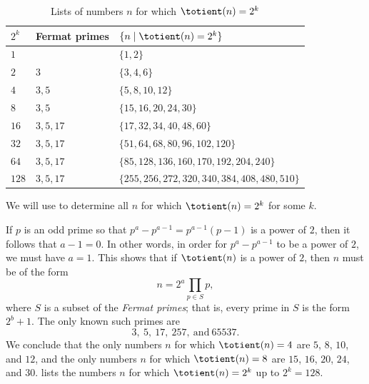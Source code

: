 \begin{example}
  \begin{table}[t]
    \centering
    \begin{tabular}{lll}
      $2^k$ & Fermat primes & $\{n\mid \totient(n)=2^k\}$ \\
      \midrule
      $1$   &             & $\{1,2\}$ \\
      $2$   & $3$         & $\{3,4,6\}$ \\
      $4$   & $3,5$       & $\{5,8,10,12\}$ \\
      $8$   & $3,5$       & $\{15,16,20,24,30\}$ \\
      $16$  & $3,5,17$    & $\{17,32,34,40,48,60\}$ \\
      $32$  & $3,5,17$    & $\{51,64,68,80,96,102,120\}$ \\
      $64$  & $3,5,17$    & $\{85,128,136,160,170,192,204,240\}$ \\
      $128$ & $3,5,17$    & $\{255,256,272,320,340,384,408,480,510\}$
    \end{tabular}
    \caption{\label{table:totient-power-of-two}Lists of numbers $n$ for which $\totient(n)=2^k$}
  \end{table}
  We will use  to determine all $n$ for which $\totient(n)=2^k$ for some $k$.

  If $p$ is an odd prime so that $p^a-p^{a-1}=p^{a-1}(p-1)$ is a power of $2$, then it follows that $a-1=0$. In other words, in order for $p^a-p^{a-1}$ to be a power of $2$, we must have $a=1$. This shows that if $\totient(n)$ is a power of $2$, then $n$ must be of the form
  \begin{equation*}
    n=2^a\prod_{p\in S}p,
  \end{equation*}
  where $S$ is a subset of the \emph{Fermat primes}; that is, every prime in $S$ is the form $2^b+1$. The only known such primes are
  \begin{equation*}
    3,~5,~17,~257,~\text{and}~65537.
  \end{equation*}
  We conclude that the only numbers $n$ for which $\totient(n)=4$ are $5$, $8$, $10$, and $12$, and the only numbers $n$ for which $\totient(n)=8$ are $15$, $16$, $20$, $24$, and $30$.  lists the numbers $n$ for which $\totient(n)=2^k$ up to $2^k=128$.
\end{example}


